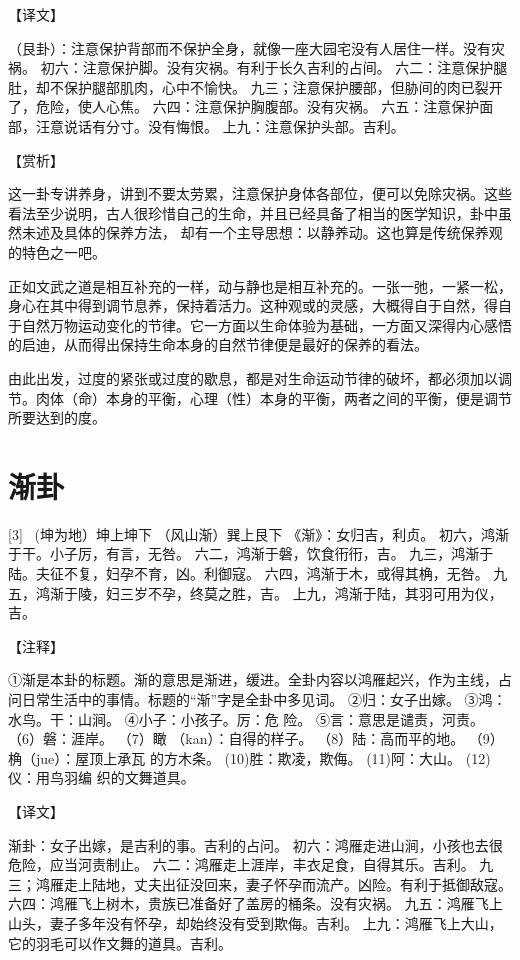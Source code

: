 \documentclass[12pt,UTF8]{ctexbook}
\begin{document}
【译文】

（艮卦）：注意保护背部而不保护全身，就像一座大园宅没有人居住一样。没有灾祸。
初六：注意保护脚。没有灾祸。有利于长久吉利的占间。
六二：注意保护腿肚，却不保护腿部肌肉，心中不愉快。
九三；注意保护腰部，但胁间的肉已裂开了，危险，使人心焦。
六四：注意保护胸腹部。没有灾祸。
六五：注意保护面部，汪意说话有分寸。没有悔恨。
上九：注意保护头部。吉利。

【赏析】

这一卦专讲养身，讲到不要太劳累，注意保护身体各部位，便可以免除灾祸。这些看法至少说明，古人很珍惜自己的生命，并且已经具备了相当的医学知识，卦中虽然未述及具体的保养方法， 却有一个主导思想：以静养动。这也算是传统保养观的特色之一吧。

正如文武之道是相互补充的一样，动与静也是相互补充的。一张一弛，一紧一松，身心在其中得到调节息养，保持着活力。这种观或的灵感，大概得自于自然，得自于自然万物运动变化的节律。它一方面以生命体验为基础，一方面又深得内心感悟的启迪，从而得出保持生命本身的自然节律便是最好的保养的看法。

由此出发，过度的紧张或过度的歇息，都是对生命运动节律的破坏，都必须加以调节。肉体（命）本身的平衡，心理（性）本身的平衡，两者之间的平衡，便是调节所要达到的度。

\chapter{渐卦}
[3] \ (坤为地）坤上坤下
（风山渐）巽上艮下
《渐》：女归吉，利贞。
初六，鸿渐于干。小子厉，有言，无咎。
六二，鸿渐于磐，饮食衎衎，吉。
九三，鸿渐于陆。夫征不复，妇孕不育，凶。利御寇。
六四，鸿渐于木，或得其桷，无咎。
九五，鸿渐于陵，妇三岁不孕，终莫之胜，吉。
上九，鸿渐于陆，其羽可用为仪，吉。

【注释】

①渐是本卦的标题。渐的意思是渐进，缓进。全卦内容以鸿雁起兴，作为主线，占问日常生活中的事情。标题的“渐”字是全卦中多见词。
②归：女子出嫁。
③鸿：水鸟。干：山涧。
④小子：小孩子。厉：危 险。
⑤言：意思是谴责，河责。
（6）磐：涯岸。
（7）瞰 （kan）：自得的样子。
（8）陆：高而平的地。
（9）桷（jue）：屋顶上承瓦 的方木条。
(10)胜：欺凌，欺侮。
(11)阿：大山。
(12)仪：用鸟羽编 织的文舞道具。

【译文】

渐卦：女子出嫁，是吉利的事。吉利的占问。
初六：鸿雁走进山涧，小孩也去很危险，应当河责制止。
六二：鸿雁走上涯岸，丰衣足食，自得其乐。吉利。
九三；鸿雁走上陆地，丈夫出征没回来，妻子怀孕而流产。凶险。有利于抵御敌寇。
六四：鸿雁飞上树木，贵族已准备好了盖房的桶条。没有灾祸。
九五：鸿雁飞上山头，妻子多年没有怀孕，却始终没有受到欺侮。吉利。
上九：鸿雁飞上大山，它的羽毛可以作文舞的道具。吉利。
\end{document}
